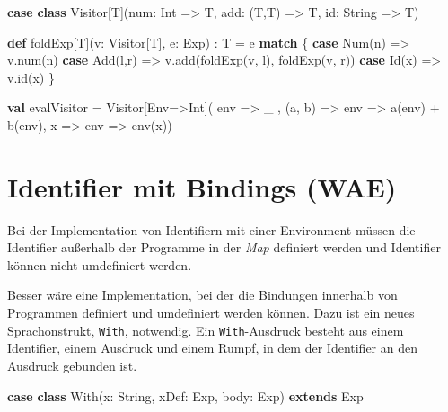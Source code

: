 \documentclass[]{article}
\newenvironment{Shaded}{}{}
\newcommand{\FunctionTok}[1]{\textcolor[rgb]{0.02,0.16,0.49}{#1}}
\newcommand{\KeywordTok}[1]{\textcolor[rgb]{0.00,0.44,0.13}{\textbf{#1}}}
\newcommand{\NormalTok}[1]{#1}
\begin{document}
\begin{Shaded}
\begin{Highlighting}[]
\KeywordTok{case} \KeywordTok{class}\NormalTok{ Visitor[T](num: Int =\textgreater{} T, add: (T,T) =\textgreater{} T, id: String =\textgreater{} T)}

\KeywordTok{def}\NormalTok{ foldExp[T](v: Visitor[T], e: Exp) : T = e }\KeywordTok{match}\NormalTok{ \{}
  \KeywordTok{case} \FunctionTok{Num}\NormalTok{(n) =\textgreater{} v.}\FunctionTok{num}\NormalTok{(n)}
  \KeywordTok{case} \FunctionTok{Add}\NormalTok{(l,r) =\textgreater{} v.}\FunctionTok{add}\NormalTok{(}\FunctionTok{foldExp}\NormalTok{(v, l), }\FunctionTok{foldExp}\NormalTok{(v, r))}
  \KeywordTok{case} \FunctionTok{Id}\NormalTok{(x) =\textgreater{} v.}\FunctionTok{id}\NormalTok{(x)}
\NormalTok{\}}

\KeywordTok{val}\NormalTok{ evalVisitor = Visitor[Env=\textgreater{}Int](}
\NormalTok{  env =\textgreater{} \_ ,}
\NormalTok{  (a, b) =\textgreater{} env =\textgreater{} }\FunctionTok{a}\NormalTok{(env) + }\FunctionTok{b}\NormalTok{(env),}
\NormalTok{  x =\textgreater{} env =\textgreater{} }\FunctionTok{env}\NormalTok{(x))}
\end{Highlighting}
\end{Shaded}

\hypertarget{identifier-mit-bindings-wae}{%
\section{Identifier mit Bindings
(WAE)}\label{identifier-mit-bindings-wae}}

Bei der Implementation von Identifiern mit einer Environment müssen die
Identifier außerhalb der Programme in der \emph{Map} definiert werden
und Identifier können nicht umdefiniert werden.

Besser wäre eine Implementation, bei der die Bindungen innerhalb von
Programmen definiert und umdefiniert werden können. Dazu ist ein neues
Sprachonstrukt, \texttt{With}, notwendig. Ein \texttt{With}-Ausdruck
besteht aus einem Identifier, einem Ausdruck und einem Rumpf, in dem der
Identifier an den Ausdruck gebunden ist.

\begin{Shaded}
\begin{Highlighting}[]
\KeywordTok{case} \KeywordTok{class} \FunctionTok{With}\NormalTok{(x: String, xDef: Exp, body: Exp) }\KeywordTok{extends}\NormalTok{ Exp}
\end{Highlighting}
\end{Shaded}
\end{document}

